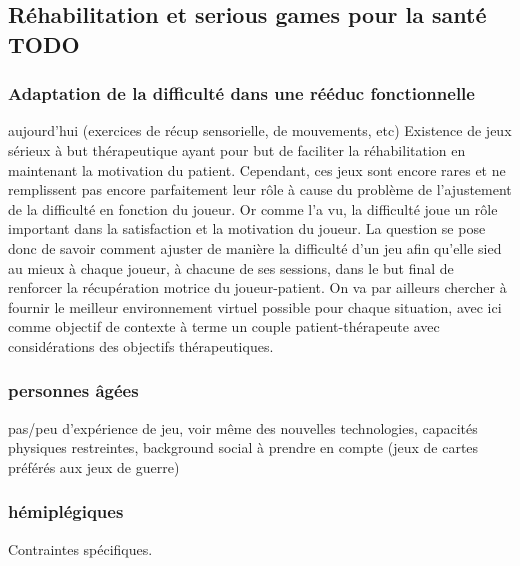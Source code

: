 \subsection{Réhabilitation et serious games pour la santé TODO}

		\subsubsection{Adaptation de la difficulté dans une rééduc fonctionnelle }
		aujourd'hui (exercices de récup sensorielle, de mouvements, etc)
Existence de jeux sérieux à but thérapeutique ayant pour but de faciliter la réhabilitation en maintenant la motivation du patient. Cependant, ces jeux sont encore rares et ne remplissent pas encore parfaitement leur rôle à cause du problème de l'ajustement de la difficulté en fonction du joueur.
Or comme l'a vu, la difficulté joue un rôle important dans la satisfaction et la motivation du joueur. La question se pose donc de savoir comment ajuster de manière la difficulté d'un jeu afin qu'elle sied au mieux à chaque joueur, à chacune de ses sessions, dans le but final de renforcer la récupération motrice du joueur-patient. On va par ailleurs chercher à fournir le meilleur environnement virtuel possible pour chaque situation, avec ici comme objectif de contexte à terme un couple patient-thérapeute avec considérations des objectifs thérapeutiques. 
		
		\subsubsection{personnes âgées}
pas/peu d'expérience de jeu, voir même des nouvelles technologies, capacités physiques restreintes, background social à prendre en compte (jeux de cartes préférés aux jeux de guerre)
		\subsubsection{hémiplégiques}		
Contraintes spécifiques.